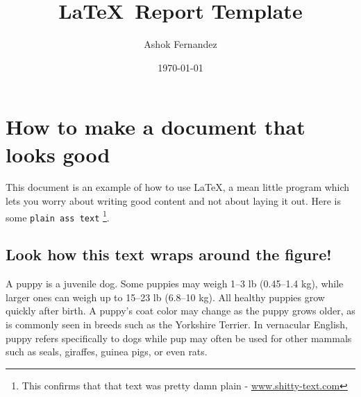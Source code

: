 \documentclass[a4paper, 12pt, notitlepage]{report}
\begin{document}
\title{\LaTeX\ Report Template} 
\author{Ashok Fernandez} 
\date{\today} 

\maketitle

\tableofcontents 

\titleformat{\chapter}[display]
 {\normalfont\huge\bfseries}{}{1em}{}

\titlespacing*{\chapter}{0pt}{-5em}{30pt}

\setlength{\parskip}{0.8em}








\chapter{How to make a document that looks good}
This document is an example of how to use \LaTeX, a mean little program which lets you worry about writing good content and not about laying it out. Here is some \texttt{plain ass text} \footnote{This confirms that that text was pretty damn plain - \url{www.shitty-text.com}}. 

\section{Look how this text wraps around the figure!}
A puppy is a juvenile dog. Some puppies may weigh 1–3 lb (0.45–1.4 kg), while larger ones can weigh up to 15–23 lb (6.8–10 kg). All healthy puppies grow quickly after birth. A puppy's coat color may change as the puppy grows older, as is commonly seen in breeds such as the Yorkshire Terrier. In vernacular English, puppy refers specifically to dogs while pup may often be used for other mammals such as seals, giraffes, guinea pigs, or even rats.
\end{document}
